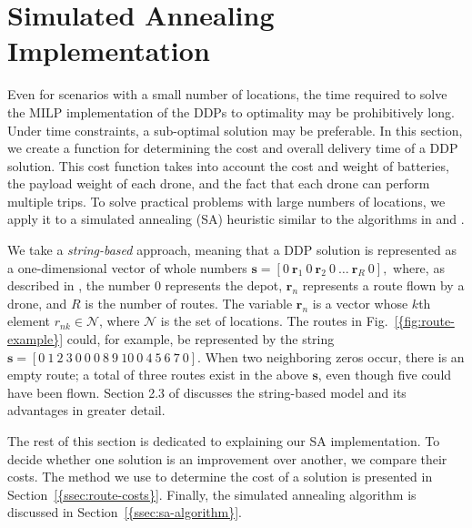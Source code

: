 \documentclass[journal]{IEEEtran}
\begin{document}
\section{Simulated Annealing Implementation}
\label{sec:sa}

Even for scenarios with a small number of locations, the time required to solve the MILP implementation of the DDPs to optimality may be prohibitively long. Under time constraints, a sub-optimal solution may be preferable. In this section, we create a function for determining the cost and overall delivery time of a DDP solution. This cost function takes into account the cost and weight of batteries, the payload weight of each drone, and the fact that each drone can perform multiple trips. To solve practical problems with large numbers of locations, we apply it to a simulated annealing (SA) \cite{Kirkpatrick1983} heuristic similar to the algorithms in \cite{Xiao2012} and \cite{Kaku2003}.

We take a \emph{string-based} approach, meaning that a DDP solution is represented as a one-dimensional vector of whole numbers
$
{\ensuremath{\mathbf{s}}} = [0 \ {\ensuremath{\mathbf{r}_{{1}}}} \ 0 \ {\ensuremath{\mathbf{r}_{{2}}}} \ 0 \ \ldots \ {\ensuremath{\mathbf{r}_{\ensuremath{R}}}} \ 0],
$
where, as described in \cite{Kaku2003}, the number 0 represents the depot, ${\ensuremath{\mathbf{r}_{{n}}}}$ represents a route flown by a drone, and ${\ensuremath{R}}$ is the number of routes. The variable ${\ensuremath{\mathbf{r}_{{n}}}}$ is a vector whose $k$th element ${\ensuremath{r_{{n}{k}}}} \in {\ensuremath{\mathcal{N}}}$, where ${\ensuremath{\mathcal{N}}}$ is the set of locations. The routes in {Fig.~\ref{{fig:route-example}}} could, for example, be represented by the string ${\ensuremath{\mathbf{s}}} = [0 \ 1 \ 2 \ 3 \ 0 \ 0 \ 0 \ 8 \ 9 \ 10 \ 0 \ 4 \ 5 \ 6 \ 7 \ 0]$. When two neighboring zeros occur, there is an empty route; a total of three routes exist in the above ${\ensuremath{\mathbf{s}}}$, even though five could have been flown. Section 2.3 of \cite{Kaku2003} discusses the string-based model and its advantages in greater detail.

The rest of this section is dedicated to explaining our SA implementation. To decide whether one solution is an improvement over another, we compare their costs. The method we use to determine the cost of a solution is presented in {Section~\ref{{ssec:route-costs}}}. Finally, the simulated annealing algorithm is discussed in {Section~\ref{{ssec:sa-algorithm}}}.
\end{document}
